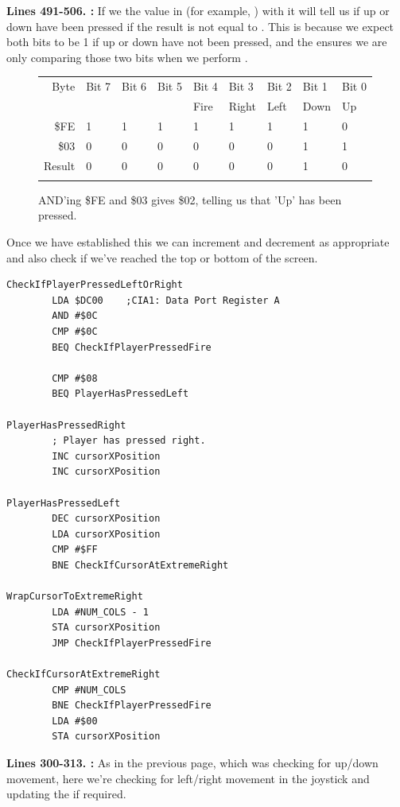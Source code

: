 \textbf{Lines 491-506. :} If we  the value in  (for
example, ) with
 it will tell us if up or down have been pressed if the result is not equal to . This is because
we expect both bits to be 1 if up or down have not been pressed, and the  ensures we are only comparing those
two bits when we perform .
\begin{figure}[H]
  {
    \setlength{\tabcolsep}{3.0pt}
    \setlength\cmidrulewidth{\heavyrulewidth} %
    \begin{adjustbox}{width=7cm,center}

      \begin{tabular}{rllllllll}
        \toprule
        Byte & Bit 7 & Bit 6 & Bit 5 & Bit 4 & Bit 3 & Bit 2 & Bit 1 & Bit 0        \\
             &       &       &       & Fire  & Right & Left  & Down  & Up           \\
        \midrule
        \$FE & 1 & 1 & 1 & 1 & 1 & 1 & 1 & 0 \\
        \$03 & 0 & 0 & 0 & 0 & 0 & 0 & 1 & 1 \\
        \midrule
        Result & 0 & 0 & 0 & 0 & 0 & 0 & 1 & 0 \\
        \addlinespace
        \bottomrule
      \end{tabular}
    \end{adjustbox}
    }\caption*{AND'ing \$FE and \$03 gives \$02, telling us that 'Up' has been pressed.}
\end{figure}

Once we have established this we can increment and decrement  as appropriate and also check
if we've reached the top or bottom of the screen. 
\clearpage
\begin{lstlisting}[caption= Second part of the Interrupt Handler.]
CheckIfPlayerPressedLeftOrRight   
        LDA $DC00    ;CIA1: Data Port Register A
        AND #$0C
        CMP #$0C
        BEQ CheckIfPlayerPressedFire

        CMP #$08
        BEQ PlayerHasPressedLeft

PlayerHasPressedRight
        ; Player has pressed right.
        INC cursorXPosition
        INC cursorXPosition

PlayerHasPressedLeft   
        DEC cursorXPosition
        LDA cursorXPosition
        CMP #$FF
        BNE CheckIfCursorAtExtremeRight

WrapCursorToExtremeRight
        LDA #NUM_COLS - 1
        STA cursorXPosition
        JMP CheckIfPlayerPressedFire

CheckIfCursorAtExtremeRight   
        CMP #NUM_COLS
        BNE CheckIfPlayerPressedFire
        LDA #$00
        STA cursorXPosition

\end{lstlisting}
\clearpage
\textbf{Lines 300-313. :} As in the previous page, which was checking
for up/down movement, here we're checking for left/right movement in the joystick and updating the  if required.

